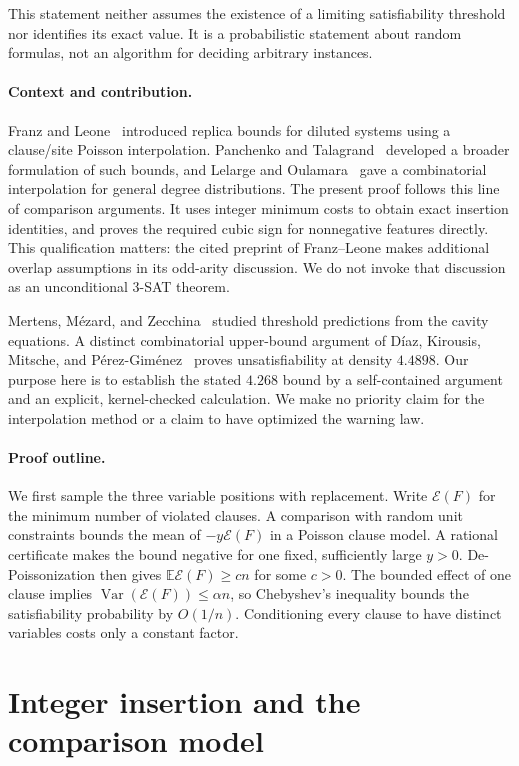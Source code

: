 \documentclass[11pt]{article}
\theoremstyle{remark}
\newcommand{\E}{\mathbb{E}}
\newcommand{\Var}{\operatorname{Var}}
\newcommand{\en}{\mathcal{E}}
\begin{document}
This statement neither assumes the existence of a limiting satisfiability
threshold nor identifies its exact value. It is a probabilistic statement
about random formulas, not an algorithm for deciding arbitrary instances.

\paragraph{Context and contribution.}
Franz and Leone~\cite{FL} introduced replica bounds for diluted systems
using a clause/site Poisson interpolation. Panchenko and
Talagrand~\cite{PT} developed a broader formulation of such bounds, and
Lelarge and Oulamara~\cite{LO} gave a combinatorial interpolation for
general degree distributions. The present proof follows this line of
comparison arguments. It uses integer minimum costs to obtain exact
insertion identities, and proves the required cubic sign for nonnegative
features directly. This qualification matters: the cited preprint of
Franz--Leone makes additional overlap assumptions in its odd-arity
discussion. We do not invoke that discussion as an unconditional 3-SAT
theorem.

Mertens, M\'ezard, and Zecchina~\cite{MMZ} studied threshold predictions
from the cavity equations. A distinct combinatorial upper-bound argument
of D\'iaz, Kirousis, Mitsche, and P\'erez-Gim\'enez~\cite{DKMP} proves
unsatisfiability at density $4.4898$. Our purpose here is to establish the
stated $4.268$ bound by a self-contained argument and an explicit,
kernel-checked calculation. We make no priority claim for the interpolation
method or a claim to have optimized the warning law.

\paragraph{Proof outline.}
We first sample the three variable positions with replacement. Write
$\en(F)$ for the minimum number of violated clauses. A comparison with
random unit constraints bounds the mean of $-y\en(F)$ in a Poisson clause
model. A rational certificate makes the bound negative for one fixed,
sufficiently large $y>0$. De-Poissonization then gives
$\E\en(F)\geq cn$ for some $c>0$. The bounded effect of one clause implies
$\Var(\en(F))\leq\alpha n$, so Chebyshev's inequality bounds the
satisfiability probability by $O(1/n)$. Conditioning every clause to have
distinct variables costs only a constant factor.

\section{Integer insertion and the comparison model}
\end{document}
